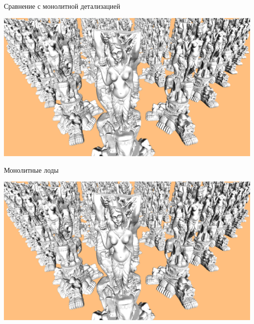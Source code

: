 \begin{frame}{Сравнение с монолитной детализацией}
    \begin{center}
        \begin{minipage}{.45\textwidth}
            \begin{center}
                \includegraphics[width=\textwidth]{../Text/pics/comparison-mono.png}

                Монолитные лоды
            \end{center}
        \end{minipage}
        \begin{minipage}{.45\textwidth}
            \begin{center}
                \includegraphics[width=\textwidth]{../Text/pics/comparison-cluster.png}


\end{center}
\end{minipage}
\end{center}
\end{frame}

